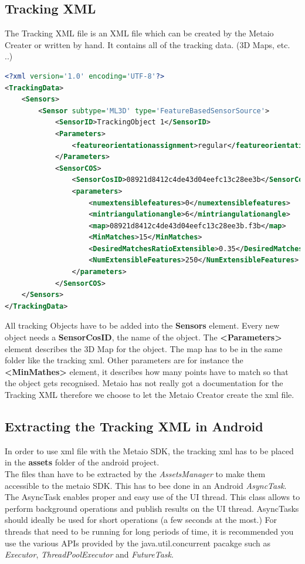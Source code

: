 \subsection{Tracking XML}
The Tracking XML file is an XML file which can be created by the Metaio Creater or written by hand. It contains all of the tracking data. (3D Maps, etc. ..)
\begin{lstlisting}[language=xml, caption=Tracking XML example]
<?xml version='1.0' encoding='UTF-8'?>
<TrackingData>
	<Sensors>
		<Sensor subtype='ML3D' type='FeatureBasedSensorSource'>
			<SensorID>TrackingObject 1</SensorID>
			<Parameters>
				<featureorientationassignment>regular</featureorientationassignment>
			</Parameters>
			<SensorCOS>
				<SensorCosID>08921d8412c4de43d04eefc13c28ee3b</SensorCosID>
				<parameters>
					<numextensiblefeatures>0</numextensiblefeatures>
					<mintriangulationangle>6</mintriangulationangle>
					<map>08921d8412c4de43d04eefc13c28ee3b.f3b</map>
					<MinMatches>15</MinMatches>
					<DesiredMatchesRatioExtensible>0.35</DesiredMatchesRatioExtensible>
					<NumExtensibleFeatures>250</NumExtensibleFeatures>
				</parameters>
			</SensorCOS>	
	</Sensors>
</TrackingData>
\end{lstlisting}
All tracking Objects have to be added into the \textbf{Sensors} element. Every new object needs a \textbf{SensorCosID}, the name of the object. The \textbf{<Parameters>} element describes the 3D Map for the object. The map has to be in the same folder like the tracking xml. Other parameters are for instance the  \textbf{<MinMathes>} element, it describes how many points have to match so that the object gets recognised. Metaio has not really got a documentation for the Tracking XML therefore we choose to let the Metaio Creator create the xml file.


\subsection{Extracting the Tracking XML in Android}
In order to use xml file with the Metaio SDK, the tracking xml has to be placed in the \textbf{assets} folder of the android project.
\\


The files than have to be extracted by the \textit{AssetsManager} to make them accessible to the metaio SDK. This has to bee done in an Android \textit{AsyncTask}.
\\

The AsyncTask enables proper and easy use of the UI thread. This class allows to perform background operations and publish results on the UI thread. AsyncTasks should ideally be used for short operations (a few seconds at the most.) For threads that need to be running for long periods of time, it is recommended you use the various APIs provided by the java.util.concurrent pacakge such as \textit{Executor}, \textit{ThreadPoolExecutor} and \textit{FutureTask}.\cite{andoirdAsyncTask} 

